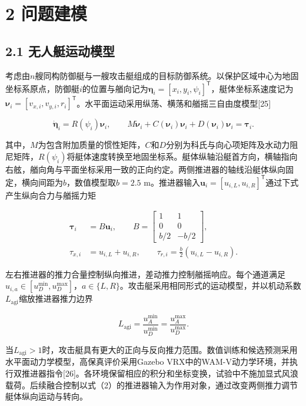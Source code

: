 \documentclass[UTF8,a4paper,zihao=5,fontset=none]{ctexart}
\begin{document}
\section*{2 问题建模}

\subsection*{2.1 无人艇运动模型}

考虑由\(n\)艘同构防御艇与一艘攻击艇组成的目标防御系统。以保护区域中心为地固坐标系原点，防御艇\(i\)的位置与艏向记为\(\boldsymbol\eta_i=[x_i,y_i,\psi_i]^{\mathsf T}\)，艇体坐标系速度记为\(\boldsymbol\nu_i=[v_{x,i},v_{y,i},r_i]^{\mathsf T}\)。水平面运动采用纵荡、横荡和艏摇三自由度模型{[}25{]}

\[
\dot{\boldsymbol\eta}_i=R(\psi_i)\boldsymbol\nu_i,
\qquad
M\dot{\boldsymbol\nu}_i+C(\boldsymbol\nu_i)\boldsymbol\nu_i+D(\boldsymbol\nu_i)\boldsymbol\nu_i=\boldsymbol\tau_i.
\tag{1}
\]

其中，\(M\)为包含附加质量的惯性矩阵，\(C\)和\(D\)分别为科氏与向心项矩阵及水动力阻尼矩阵，\(R(\psi_i)\)将艇体速度转换至地固坐标系。艇体纵轴沿艇首方向，横轴指向右舷，艏向角与平面坐标采用一致的正向约定。两侧推进器的轴线沿艇体纵向固定，横向间距为\(b\)，数值模型取\(b=2.5\) m。推进器输入\(\boldsymbol u_i=[u_{i,L},u_{i,R}]^{\mathsf T}\)通过下式产生纵向合力与艏摇力矩

\[
\begin{aligned}
\boldsymbol\tau_i&=B\boldsymbol u_i,\qquad
B=\begin{bmatrix}1&1\\0&0\\b/2&-b/2\end{bmatrix},\\
\tau_{x,i}&=u_{i,L}+u_{i,R},\qquad
\tau_{r,i}=\frac b2(u_{i,L}-u_{i,R}).
\end{aligned}
\tag{2}
\]

左右推进器的推力合量控制纵向推进，差动推力控制艏摇响应。每个通道满足\(u_{i,a}\in[u_D^{\min},u_D^{\max}]\)，\(a\in\{L,R\}\)。攻击艇采用相同形式的运动模型，并以机动系数\(L_{\mathrm{agi}}\)缩放推进器推力边界

\[
L_{\mathrm{agi}}=\frac{u_A^{\min}}{u_D^{\min}}
=\frac{u_A^{\max}}{u_D^{\max}}.
\tag{3}
\]

当\(L_{\mathrm{agi}}>1\)时，攻击艇具有更大的正向与反向推力范围。数值训练和候选预测采用水平面动力学模型，高保真评价采用Gazebo VRX中的WAM-V动力学环境，并执行双推进器指令{[}26{]}。各环境保留相应的积分和坐标变换，试验中不施加显式风浪载荷。后续融合控制以式（2）的推进器输入为作用对象，通过改变两侧推力调节艇体纵向运动与转向。
\end{document}
